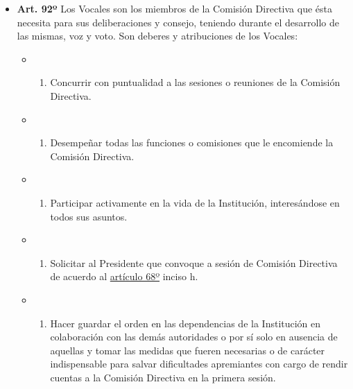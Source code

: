 \documentclass[]{book}
\providecommand{\tightlist}{%
  \setlength{\itemsep}{0pt}\setlength{\parskip}{0pt}}
\begin{document}
\begin{itemize}
\tightlist
\item
  \textbf{Art. 92º}
  Los Vocales son los miembros de la Comisión Directiva que ésta necesita para sus deliberaciones y consejo, teniendo durante el desarrollo de las mismas, voz y voto. Son deberes y atribuciones de los Vocales:

  \begin{itemize}
  \item
    \begin{enumerate}
    \def\labelenumi{\alph{enumi})}
    \tightlist
    \item
      Concurrir con puntualidad a las sesiones o reuniones de la Comisión Directiva.
    \end{enumerate}
  \item
    \begin{enumerate}
    \def\labelenumi{\alph{enumi})}
    \setcounter{enumi}{1}
    \tightlist
    \item
      Desempeñar todas las funciones o comisiones que le encomiende la Comisión Directiva.
    \end{enumerate}
  \item
    \begin{enumerate}
    \def\labelenumi{\alph{enumi})}
    \setcounter{enumi}{2}
    \tightlist
    \item
      Participar activamente en la vida de la Institución, interesándose en todos sus asuntos.
    \end{enumerate}
  \item
    \begin{enumerate}
    \def\labelenumi{\alph{enumi})}
    \setcounter{enumi}{3}
    \tightlist
    \item
      Solicitar al Presidente que convoque a sesión de Comisión Directiva de acuerdo al \protect\hyperlink{art68}{artículo 68º} inciso h.
    \end{enumerate}
  \item
    \begin{enumerate}
    \def\labelenumi{\alph{enumi})}
    \setcounter{enumi}{4}
    \tightlist
    \item
      Hacer guardar el orden en las dependencias de la Institución en colaboración con las demás autoridades o por sí solo en ausencia de aquellas y tomar las medidas que fueren necesarias o de carácter indispensable para salvar dificultades apremiantes con cargo de rendir cuentas a la Comisión Directiva en la primera sesión.
    \end{enumerate}

\end{itemize}
\end{itemize}
\end{document}
